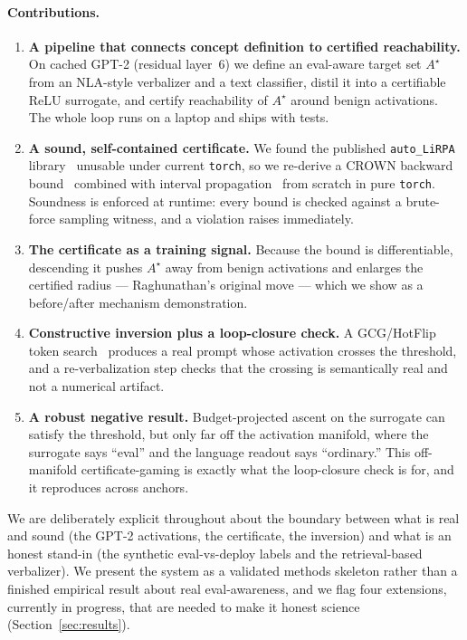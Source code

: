 \paragraph{Contributions.}
\begin{enumerate}[leftmargin=1.4em,itemsep=2pt,topsep=2pt]
  \item \textbf{A pipeline that connects concept definition to certified
  reachability.} On cached GPT-2 (residual layer~6) we define an eval-aware target
  set $A^\star$ from an NLA-style verbalizer and a text classifier, distil it into
  a certifiable ReLU surrogate, and certify reachability of $A^\star$ around benign
  activations. The whole loop runs on a laptop and ships with tests.
  \item \textbf{A sound, self-contained certificate.} We found the published
  \texttt{auto\_LiRPA} library~\cite{xu2020autolirpa} unusable under current
  \texttt{torch}, so we re-derive a CROWN backward bound~\cite{zhang2018crown}
  combined with interval propagation~\cite{gowal2018ibp} from scratch in pure
  \texttt{torch}. Soundness is enforced at runtime: every bound is checked against
  a brute-force sampling witness, and a violation raises immediately.
  \item \textbf{The certificate as a training signal.} Because the bound is
  differentiable, descending it pushes $A^\star$ away from benign activations and
  enlarges the certified radius --- Raghunathan's original move --- which we show as
  a before/after mechanism demonstration.
  \item \textbf{Constructive inversion plus a loop-closure check.} A GCG/HotFlip
  token search~\cite{zou2023gcg,ebrahimi2018hotflip} produces a real prompt whose
  activation crosses the threshold, and a re-verbalization step checks that the
  crossing is semantically real and not a numerical artifact.
  \item \textbf{A robust negative result.} Budget-projected ascent on the surrogate
  can satisfy the threshold, but only far off the activation manifold, where the
  surrogate says ``eval'' and the language readout says ``ordinary.'' This
  off-manifold certificate-gaming is exactly what the loop-closure check is for, and
  it reproduces across anchors.
\end{enumerate}

We are deliberately explicit throughout about the boundary between what is real and
sound (the GPT-2 activations, the certificate, the inversion) and what is an honest
stand-in (the synthetic eval-vs-deploy labels and the retrieval-based verbalizer).
We present the system as a validated methods skeleton rather than a finished
empirical result about real eval-awareness, and we flag four extensions, currently
in progress, that are needed to make it honest science (Section~\ref{sec:results}).
